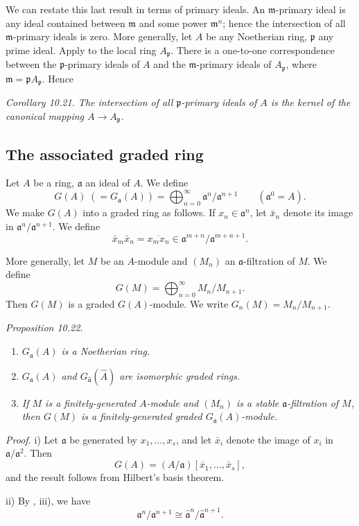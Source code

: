 We can restate this last result in terms of primary ideals. An $\mathfrak m$-primary ideal is any ideal contained between $\mathfrak m$ and some power $\mathfrak m^n$; hence the intersection of all $\mathfrak m$-primary ideals is zero. More generally, let $A$ be any Noetherian ring, $\mathfrak p$ any prime ideal. Apply  to the local ring $A_{\mathfrak p}$. There is a one-to-one correspondence between the $\mathfrak p$-primary ideals of $A$ and the $\mathfrak m$-primary ideals of $A_{\mathfrak p}$, where $\mathfrak m=\mathfrak pA_{\mathfrak p}$. Hence

\noindent\textit{Corollary 10.21. The intersection of all $\mathfrak p$-primary ideals of $A$ is the kernel of the canonical mapping $A\longrightarrow A_{\mathfrak p}$.} \proofbox

\subsection{The associated graded ring}

Let $A$ be a ring, $\mathfrak a$ an ideal of $A$. We define
\[
G(A)\;(=G_{\mathfrak a}(A))=\bigoplus_{n=0}^{\infty}\mathfrak a^n/\mathfrak a^{n+1}\qquad(\mathfrak a^0=A).
\]
We make $G(A)$ into a graded ring as follows. If $x_n\in\mathfrak a^n$, let $\bar x_n$ denote its image in $\mathfrak a^n/\mathfrak a^{n+1}$. We define
\[
\bar x_m\bar x_n=\overline{x_mx_n}\in\mathfrak a^{m+n}/\mathfrak a^{m+n+1}.
\]

More generally, let $M$ be an $A$-module and $(M_n)$ an $\mathfrak a$-filtration of $M$. We define
\[
G(M)=\bigoplus_{n=0}^{\infty}M_n/M_{n+1}.
\]
Then $G(M)$ is a graded $G(A)$-module. We write $G_n(M)=M_n/M_{n+1}$.

\noindent\textit{Proposition 10.22.}
\begin{enumerate}
\renewcommand{\labelenumi}{\roman{enumi})}
\item \textit{$G_{\mathfrak a}(A)$ is a Noetherian ring.}
\item \textit{$G_{\mathfrak a}(A)$ and $G_{\widehat{\mathfrak a}}(\widehat A)$ are isomorphic graded rings.}
\item \textit{If $M$ is a finitely-generated $A$-module and $(M_n)$ is a stable $\mathfrak a$-filtration of $M$, then $G(M)$ is a finitely-generated graded $G_{\mathfrak a}(A)$-module.}
\end{enumerate}

\noindent\textit{Proof.} i) Let $\mathfrak a$ be generated by $x_1,\ldots,x_s$, and let $\bar x_i$ denote the image of $x_i$ in $\mathfrak a/\mathfrak a^2$. Then
\[
G(A)=(A/\mathfrak a)[\bar x_1,\ldots,\bar x_s],
\]
and the result follows from Hilbert's basis theorem.

ii) By , iii), we have
\[
\mathfrak a^n/\mathfrak a^{n+1}\cong\widehat{\mathfrak a}^{n}/\widehat{\mathfrak a}^{n+1}.
\]
